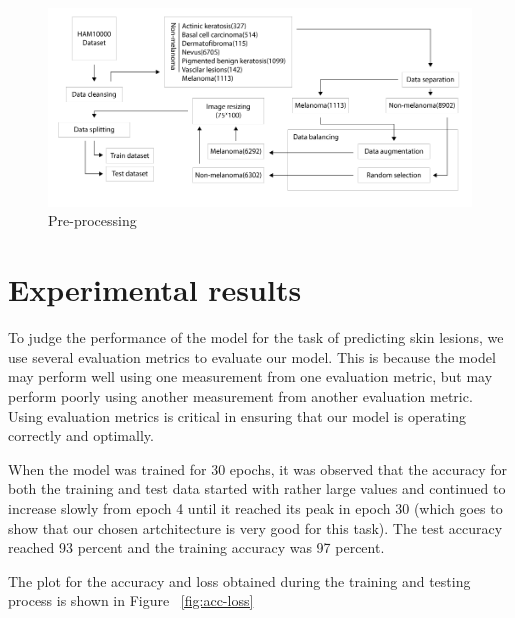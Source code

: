         \begin{figure}[htbp]
        \begin{center}
        \includegraphics[width=15cm]{./chapter-05-our-contribution/4.png}
        \end{center}
        \caption{Pre-processing}
        \label{fig:steps}
        \end{figure}



\section{Experimental results}
    To judge the performance of the model for the task of predicting skin lesions, we use several evaluation metrics to evaluate our model. This is because the model may perform well using one measurement from one evaluation metric, but may perform poorly using another measurement from another evaluation metric. Using evaluation metrics is critical in ensuring that our model is operating correctly and optimally.

    When the model was trained for 30 epochs, it was observed that the accuracy for both the training and test data started with rather large values and continued to increase slowly from epoch 4 until it reached its peak in epoch 30 (which goes to show that our chosen artchitecture is very good for this task). The test accuracy reached 93 percent and the training accuracy was 97 percent.

    The plot for the accuracy and loss obtained during the training and testing process is shown in Figure ~\ref{fig:acc-loss}

